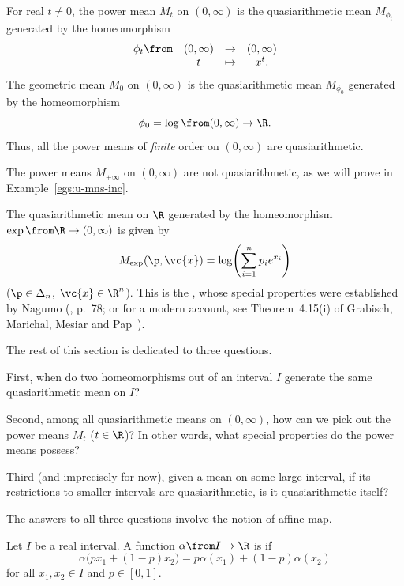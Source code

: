 \begin{example}
For real $t \neq 0$, the power mean $M_t$ on $(0, \infty)$ is the
quasiarithmetic mean $M_{\phi_t}$ generated by the homeomorphism
\[
\begin{array}{cccc}
\phi_t \from    &(0, \infty)    &\to            &(0, \infty)    \\
                &t              &\mapsto        &x^t.
\end{array}
\]
The geometric mean $M_0$ on $(0, \infty)$ is the quasiarithmetic mean
$M_{\phi_0}$ generated by the homeomorphism
\[
\phi_0 = \log \from (0, \infty) \to \R.
\]
Thus, all the power means of \emph{finite} order on $(0, \infty)$ are
quasiarithmetic. 
\end{example}

\begin{example}
The power means $M_{\pm\infty}$ on $(0, \infty)$ are not
quasiarithmetic, as we will prove in
Example~\ref{egs:u-mns-inc}. 
\end{example}

\begin{example}
The quasiarithmetic mean on $\R$ generated by the homeomorphism $\exp \from
\R \to (0, \infty)$ is given by
\[
M_{\exp}(\p, \vc{x})
=
\log \Biggl( \sum_{i = 1}^n p_i e^{x_i} \Biggr)
\]
($\p \in \Delta_n$, $\vc{x} \in \R^n$).  This is the
, whose special properties were established by Nagumo (\cite{Nagu},
p.~78; or for a modern account, see Theorem~4.15(i) of Grabisch, Marichal,
Mesiar and Pap~\cite{GMMP}).
\end{example}

The rest of this section is dedicated to three questions.  

First, when do two homeomorphisms out of an interval $I$ generate the same
quasiarithmetic mean on $I$?   

Second, among all quasiarithmetic means on $(0, \infty)$, how can we pick
out the power means $M_t$ ($t \in \R$)?  In other words, what special
properties do the power means possess?

Third (and imprecisely for now), given a mean on some large interval, if
its restrictions to smaller intervals are quasiarithmetic, is it
quasiarithmetic itself?

The answers to all three questions involve the notion of affine map.

\begin{defn}
Let $I$ be a real interval.  A function $\alpha \from I \to \R$ is
%
%
% 
if 
\[
\alpha \bigl(px_1 + (1 - p)x_2\bigr) 
= 
p\alpha(x_1) + (1 - p)\alpha(x_2)
\]
for all $x_1, x_2 \in I$ and $p \in [0, 1]$.  
\end{defn}

